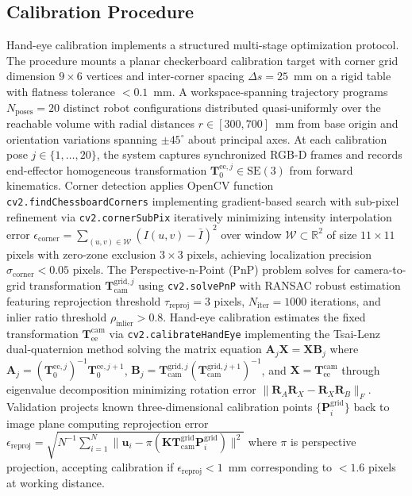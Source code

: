 \documentclass[journal]{IEEEtran}
\begin{document}
\subsection{Calibration Procedure}

Hand-eye calibration implements a structured multi-stage optimization protocol. The procedure mounts a planar checkerboard calibration target with corner grid dimension $9 \times 6$ vertices and inter-corner spacing $\Delta s = 25$~mm on a rigid table with flatness tolerance $< 0.1$~mm. A workspace-spanning trajectory programs $N_{\text{poses}} = 20$ distinct robot configurations distributed quasi-uniformly over the reachable volume with radial distances $r \in [300, 700]$~mm from base origin and orientation variations spanning $\pm 45^\circ$ about principal axes. At each calibration pose $j \in \{1, \ldots, 20\}$, the system captures synchronized RGB-D frames and records end-effector homogeneous transformation $\mathbf{T}_{0}^{\text{ee},j} \in \text{SE}(3)$ from forward kinematics. Corner detection applies OpenCV function \texttt{cv2.findChessboardCorners} implementing gradient-based search with sub-pixel refinement via \texttt{cv2.cornerSubPix} iteratively minimizing intensity interpolation error $\epsilon_{\text{corner}} = \sum_{(u,v) \in \mathcal{W}} (I(u,v) - \bar{I})^2$ over window $\mathcal{W} \subset \mathbb{R}^2$ of size $11 \times 11$ pixels with zero-zone exclusion $3 \times 3$ pixels, achieving localization precision $\sigma_{\text{corner}} < 0.05$ pixels. The Perspective-n-Point (PnP) problem solves for camera-to-grid transformation $\mathbf{T}_{\text{cam}}^{\text{grid},j}$ using \texttt{cv2.solvePnP} with RANSAC robust estimation featuring reprojection threshold $\tau_{\text{reproj}} = 3$ pixels, $N_{\text{iter}} = 1000$ iterations, and inlier ratio threshold $\rho_{\text{inlier}} > 0.8$. Hand-eye calibration estimates the fixed transformation $\mathbf{T}_{\text{ee}}^{\text{cam}}$ via \texttt{cv2.calibrateHandEye} implementing the Tsai-Lenz dual-quaternion method \cite{tsai1989new} solving the matrix equation $\mathbf{A}_j \mathbf{X} = \mathbf{X} \mathbf{B}_j$ where $\mathbf{A}_j = (\mathbf{T}_{0}^{\text{ee},j})^{-1} \mathbf{T}_{0}^{\text{ee},j+1}$, $\mathbf{B}_j = \mathbf{T}_{\text{cam}}^{\text{grid},j} (\mathbf{T}_{\text{cam}}^{\text{grid},j+1})^{-1}$, and $\mathbf{X} = \mathbf{T}_{\text{ee}}^{\text{cam}}$ through eigenvalue decomposition minimizing rotation error $\|\mathbf{R}_A \mathbf{R}_X - \mathbf{R}_X \mathbf{R}_B\|_F$. Validation projects known three-dimensional calibration points $\{\mathbf{P}_i^{\text{grid}}\}$ back to image plane computing reprojection error $\epsilon_{\text{reproj}} = \sqrt{N^{-1} \sum_{i=1}^{N} \|\mathbf{u}_i - \pi(\mathbf{K} \mathbf{T}_{\text{cam}}^{\text{grid}} \mathbf{P}_i^{\text{grid}})\|^2}$ where $\pi$ is perspective projection, accepting calibration if $\epsilon_{\text{reproj}} < 1$~mm corresponding to $< 1.6$ pixels at working distance.
\end{document}
